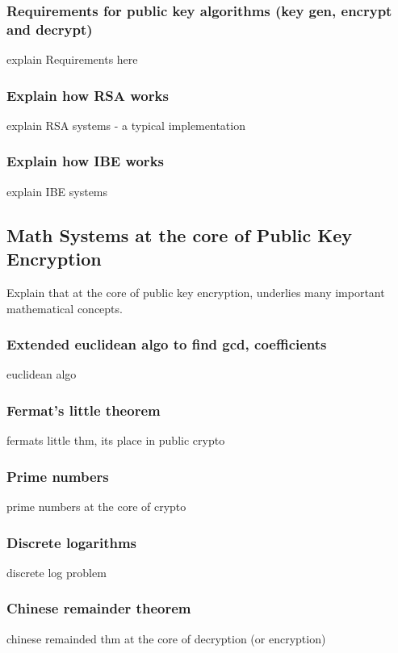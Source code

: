 \documentclass[conference]{IEEEtran}
\begin{document}
\subsubsection{Requirements for public key algorithms (key gen, encrypt and decrypt)}
explain Requirements here

\subsubsection{Explain how RSA works}
explain RSA systems - a typical implementation

\subsubsection{Explain how IBE works}
explain IBE systems

\subsection{Math Systems at the core of Public Key Encryption}
Explain that at the core of public key encryption, underlies
many important mathematical concepts.

\subsubsection{Extended euclidean algo to find gcd, coefficients}
euclidean algo

\subsubsection{Fermat's little theorem}
fermats little thm, its place in public crypto

\subsubsection{Prime numbers}
prime numbers at the core of crypto

\subsubsection{Discrete logarithms}
discrete log problem

\subsubsection{Chinese remainder theorem}
chinese remainded thm at the core of decryption (or encryption)
\end{document}
